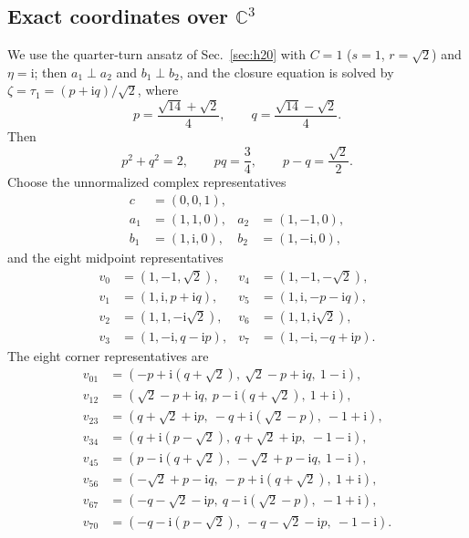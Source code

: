 \documentclass[twocolumn,aps,pra,floatfix,amsmath,amssymb,longbibliography]{revtex4-2}
\theoremstyle{definition}
\theoremstyle{remark}
\newcommand{\ii}{\mathrm{i}}
\newcommand{\C}{\mathbb C}
\begin{document}
\subsection{Exact coordinates over \texorpdfstring{$\C^3$}{C3}}

We use the quarter-turn ansatz of Sec.~\ref{sec:h20} with $C=1$ ($s=1$,
$r=\sqrt2$) and $\eta=\ii$; then $a_1\perp a_2$ and $b_1\perp b_2$, and the
closure equation is solved by $\zeta=\tau_1=(p+\ii q)/\sqrt2$, where
\begin{equation}
 p=\frac{\sqrt{14}+\sqrt2}{4},\qquad
 q=\frac{\sqrt{14}-\sqrt2}{4}.
 \label{eq:pq}
\end{equation}
Then
\begin{equation}
 p^2+q^2=2,\qquad pq=\frac34,\qquad p-q=\frac{\sqrt2}{2}.
 \label{eq:pq-identities}
\end{equation}
Choose the unnormalized complex representatives
\begin{align}
 c&=(0,0,1),\nonumber\\
 a_1&=(1,1,0),&a_2&=(1,-1,0),\nonumber\\
 b_1&=(1,\ii,0),&b_2&=(1,-\ii,0),
 \label{eq:h21-inner}
\end{align}
and the eight midpoint representatives
\begin{align}
 v_0&=(1,-1,\sqrt2),&v_4&=(1,-1,-\sqrt2),\nonumber\\
 v_1&=(1,\ii,p+\ii q),&v_5&=(1,\ii,-p-\ii q),\nonumber\\
 v_2&=(1,1,-\ii\sqrt2),&v_6&=(1,1,\ii\sqrt2),\nonumber\\
 v_3&=(1,-\ii,q-\ii p),&v_7&=(1,-\ii,-q+\ii p).
 \label{eq:h21-midpoints}
\end{align}
The eight corner representatives are
\begin{align}
 v_{01}&=(-p+\ii(q+\sqrt2),\ \sqrt2-p+\ii q,\ 1-\ii),\nonumber\\
 v_{12}&=(\sqrt2-p+\ii q,\ p-\ii(q+\sqrt2),\ 1+\ii),\nonumber\\
 v_{23}&=(q+\sqrt2+\ii p,\ -q+\ii(\sqrt2-p),\ -1+\ii),\nonumber\\
 v_{34}&=(q+\ii(p-\sqrt2),\ q+\sqrt2+\ii p,\ -1-\ii),\nonumber\\
 v_{45}&=(p-\ii(q+\sqrt2),\ -\sqrt2+p-\ii q,\ 1-\ii),\nonumber\\
 v_{56}&=(-\sqrt2+p-\ii q,\ -p+\ii(q+\sqrt2),\ 1+\ii),\nonumber\\
 v_{67}&=(-q-\sqrt2-\ii p,\ q-\ii(\sqrt2-p),\ -1+\ii),\nonumber\\
 v_{70}&=(-q-\ii(p-\sqrt2),\ -q-\sqrt2-\ii p,\ -1-\ii).
 \label{eq:h21-corners}
\end{align}
\end{document}
